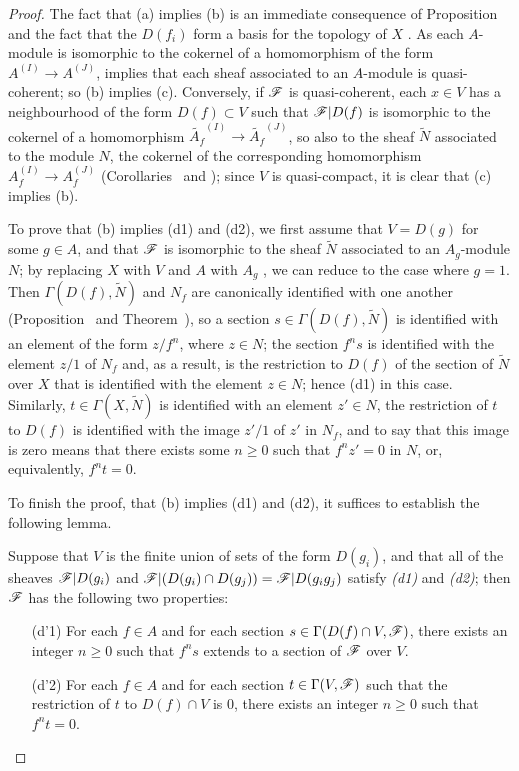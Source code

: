 \begin{proof}
The fact that (a) implies (b) is an immediate consequence of Proposition~ and the fact that the $D(f_i)$ form a basis for the topology of $X$ .
As each $A$-module is isomorphic to the cokernel of a homomorphism of the form $A^{(I)}\to A^{(J)}$,  implies that each sheaf associated to an $A$-module is quasi-coherent;
so (b) implies (c).
Conversely, if $\mathscr{F}$ is quasi-coherent, each $x\in V$ has a neighbourhood of the form $D(f)\subset V$ such that $\mathscr{F}|D(f)$ is isomorphic to the cokernel of a homomorphism $\widetilde{A_f}^{(I)}\to\widetilde{A_f}^{(J)}$, so also to the sheaf $\widetilde{N}$ associated to the module $N$, the cokernel of the corresponding homomorphism
$A_f^{(I)}\to A_f^{(J)}$ (Corollaries~ and );
since $V$ is quasi-compact, it is clear that (c) implies (b).

To prove that (b) implies (d1) and (d2), we first assume that $V=D(g)$ for some $g\in A$, and that $\mathscr{F}$ is isomorphic to the sheaf $\widetilde{N}$ associated to an $A_g$-module $N$;
by replacing $X$ with $V$ and $A$ with $A_g$ , we can reduce to the case where $g=1$.
Then $\Gamma(D(f),\widetilde{N})$ and $N_f$ are canonically identified with one another (Proposition~ and Theorem~), so a section $s\in\Gamma(D(f),\widetilde{N})$ is identified with an element of the form $z/f^n$, where $z\in N$;
the section $f^n s$ is identified with the element $z/1$ of $N_f$ and, as a result, is the restriction to $D(f)$ of the section of $\widetilde{N}$ over $X$ that is identified with the element $z\in N$;
hence (d1) in this case.
Similarly, $t\in\Gamma(X,\widetilde{N})$ is identified with an element $z'\in N$, the restriction of $t$ to $D(f)$ is identified with the image $z'/1$ of $z'$ in $N_f$, and to say that this image is zero means that there exists some $n\geq 0$ such that $f^n z'=0$ in $N$, or, equivalently, $f^n t=0$.

To finish the proof, that (b) implies (d1) and (d2), it suffices to establish the following lemma.
\begin{lemma}[1.4.1.1]
\label{I.1.4.1.1}
Suppose that $V$ is the finite union of sets of the form $D(g_i)$, and that all of the sheaves $\mathscr{F}|D(g_i)$ and $\mathscr{F}|(D(g_i)\cap D(g_j))=\mathscr{F}|D(g_i g_j)$ satisfy \emph{(d1)} and \emph{(d2)};
then $\mathscr{F}$ has the following two properties:
\begin{enumerate}
  \item[{\rm(d'1)}] For each $f\in A$ and for each section $s\in\Gamma(D(f)\cap V,\mathscr{F})$, there exists an integer $n\geq 0$ such that $f^n s$ extends to a section of $\mathscr{F}$ over $V$.
  \item[{\rm(d'2)}] For each $f\in A$ and for each section $t\in\Gamma(V,\mathscr{F})$ such that the restriction of $t$ to $D(f)\cap V$ is $0$, there exists an integer $n\geq 0$ such that $f^n t=0$.
\end{enumerate}
\end{lemma}


\end{proof}
